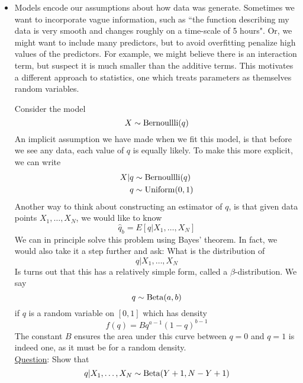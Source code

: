 \begin{itemize}
\item Models encode our assumptions about how data was generate. Sometimes we want to incorporate vague information, such as ``the function describing my data is very smooth and changes roughly on a time-scale of 5 hours". Or, we might want to include many predictors, but to avoid overfitting penalize high values of the predictors. For example, we might believe there is an interaction term, but suspect it is much smaller than the additive terms. This motivates a different approach to statistics, one which treats parameters as themselves random variables.  

\begin{example}\label{ex:beta}
Consider the model 
\begin{equation*}
X \sim {\rm Bernoullli}(q)
\end{equation*}
An implicit assumption we have made when we fit this model, is that before we see any data, each value of $q$ is equally likely. To make this more explicit, we can write
\begin{align*}
X|q &\sim {\rm Bernoullli}(q)\\
q &\sim {\rm Uniform}(0,1)
\end{align*}
Another way to think about constructing an estimator of $q$, is that given data points $X_1,\dots,X_N$, we would like to know 
\begin{equation}
\hat{q}_b = E[q|X_1,\dots,X_N]\label{eq:qhatb}
\end{equation}
We can in principle solve this problem using Bayes' theorem. In fact, we would also take it a step further and ask: What is the distribution of
\begin{equation*}
q|X_1,\dots,X_N
\end{equation*}
Is turns out that this has a relatively simple form, called a $\beta$-distribution. We say 
\begin{equation*}
q \sim {\rm Beta}(a,b)
\end{equation*}
if $q$ is a random variable on $[0,1]$ which has density 
\begin{equation*}
f(q) = Bq^{a-1}(1-q)^{b-1}
\end{equation*}
The constant $B$ ensures the area under this curve between $q=0$ and $q=1$ is indeed one, as it must be for a random density. \\


\noindent
\underline{Question}: Show that 
\begin{equation*}
q|X_1,\dots,X_N \sim {\rm Beta}(Y+1,N-Y+1)
\end{equation*}



\end{example}
\end{itemize}
